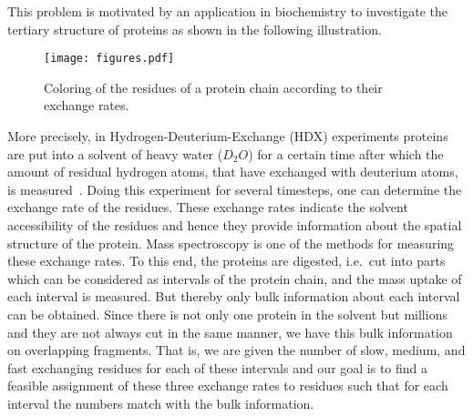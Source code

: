 \documentclass[a4paper,11pt]{article}
\theoremstyle{theorem}
\begin{document}
This problem is motivated by an application in biochemistry to investigate the tertiary structure of proteins as shown in the following illustration.
\begin{figure}[hb]
 \centering
 \texttt{[image: figures.pdf]}
 \caption{Coloring of the residues of a protein chain according to their exchange rates.}
 \label{fig:bio}
\end{figure}
More precisely, in Hydrogen-Deuterium-Exchange (HDX) experiments proteins are put into a solvent of heavy water ($D_2O$) for a certain time after which the amount of residual hydrogen atoms, that have exchanged with deuterium atoms, is measured~\cite{LEHMP02}. Doing this experiment for several timesteps, one can determine the exchange rate of the residues. These exchange rates indicate the solvent accessibility of the residues and hence they provide information about the spatial structure of the protein. Mass spectroscopy is one of the methods for measuring these exchange rates. To this end, the proteins are digested, i.e.~cut into parts which can be considered as intervals of the protein chain, and the mass uptake of each interval is measured. But thereby only bulk information about each interval can be obtained. Since there is not only one protein in the solvent but millions and they are not always cut in the same manner, we have this bulk information on overlapping fragments. That is, we are given the number of slow, medium, and fast exchanging residues for each of these intervals and our goal is to find a feasible assignment of these three exchange rates to residues such that for each interval the numbers match with the bulk information. 
\end{document}
